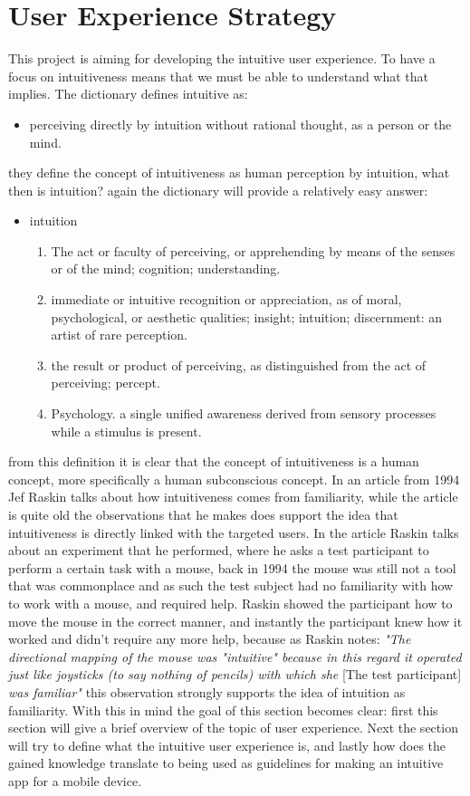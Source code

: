 \section{User Experience Strategy}
This project is aiming for developing the intuitive user experience. To have a 
focus on intuitiveness means that we must be able to understand what that 
implies. The dictionary defines intuitive as: 
\begin{itemize}
\item perceiving directly by intuition without rational thought, as a person or 
the mind.
\end{itemize}
they define the concept of intuitiveness as human perception by intuition, what 
then is intuition? again the dictionary will provide a relatively easy answer: 
\begin{itemize}
\item intuition\\
\begin{enumerate}
\item The act or faculty of perceiving, or apprehending by means of the senses or 
of the mind; cognition; understanding.
\item immediate or intuitive recognition or appreciation, as of moral, 
psychological, or aesthetic qualities; insight; intuition; discernment:
an artist of rare perception.
\item the result or product of perceiving, as distinguished from the act of 
perceiving; percept.
\item Psychology. a single unified awareness derived from sensory processes while 
a stimulus is present.
\end{enumerate}
\end{itemize} from this definition it is clear that the concept of intuitiveness 
is a human concept, more specifically a human subconscious concept. In an article 
from 1994 Jef Raskin\cite{JRaskin} talks about how intuitiveness comes from 
familiarity, while the article is quite old the observations that he makes does 
support the idea that intuitiveness is directly linked with the targeted users. 
In the article Raskin talks about an experiment that he performed, where he asks 
a test participant to perform a certain task with a mouse, back in 1994 the mouse 
was still not a tool that was commonplace and as such the test subject had no 
familiarity with how to work with a mouse, and required help. Raskin showed the 
participant how to move the mouse in the correct manner, and instantly the 
participant knew how it worked and didn't require any more help, because as 
Raskin notes: \textit{"The directional mapping of the mouse was "intuitive" 
because in this regard it operated just like joysticks (to say nothing of 
pencils) with which she} [The test participant] \textit{was familiar"}
\cite{JRaskin} this observation strongly supports the idea of intuition as 
familiarity. With this in mind the goal of this section becomes clear: first this 
section will give a brief overview of the topic of user experience. Next the 
section will try to define what the intuitive user experience is, and lastly how 
does the gained knowledge translate to being used as guidelines for making an 
intuitive app for a mobile device.  

